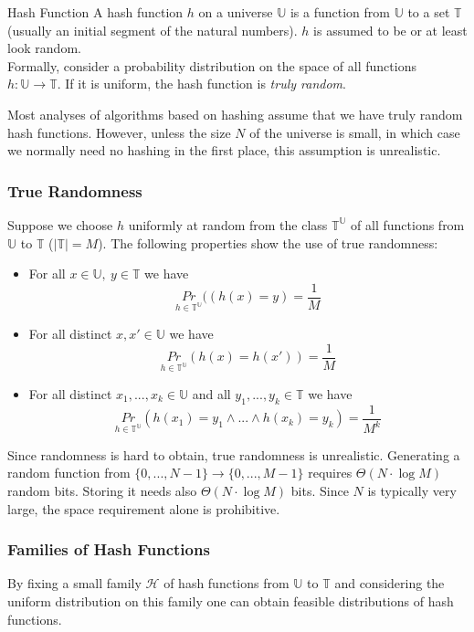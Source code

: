 \documentclass[english]{panikzettel}
\begin{document}
\begin{defi}{Hash Function}
A hash function $h$ on a universe $\mathbb{U}$ is a function from $\mathbb{U}$ to a set $\mathbb{T}$ (usually an initial segment of the natural numbers). $h$ is assumed to be or at least look random.\\
Formally, consider a probability distribution on the space of all functions $h:\mathbb{U}\to\mathbb{T}$. If it is uniform, the hash function is \emph{truly random}.
\end{defi}

Most analyses of algorithms based on hashing assume that we have truly random hash functions. However, unless the size $N$ of the universe is small, in which case we normally need no hashing in the first place, this assumption is unrealistic.

\subsubsection{True Randomness}
Suppose we choose $h$ uniformly at random from the class $\mathbb{T}^\mathbb{U}$ of all functions from $\mathbb{U}$ to $\mathbb{T}$ ($|\mathbb{T}|=M$). The following properties show the use of true randomness:
\begin{itemize}
\item For all $x\in\mathbb{U}, \ y\in \mathbb{T}$ we have
\[
\underset{h\in\mathbb{T}^\mathbb{U}}{Pr}((h(x)=y)=\frac{1}{M}
\]
\item For all distinct $x,x'\in\mathbb{U}$ we have
\[
\underset{h\in\mathbb{T}^\mathbb{U}}{Pr}(h(x) = h(x'))=\frac{1}{M}
\]
\item For all distinct $x_1,...,x_k\in\mathbb{U}$ and all $y_1,...,y_k\in\mathbb{T}$ we have
\[
\underset{h\in\mathbb{T}^\mathbb{U}}{Pr}(h(x_1)=y_1 \wedge ... \wedge h(x_k)=y_k)=\frac{1}{M^k}
\]
\end{itemize}
Since randomness is hard to obtain, true randomness is unrealistic.
Generating a random function from $\{0,...,N-1 \} \to \{0,...,M-1 \}$ requires $\Theta(N\cdot \log M)$ random bits.
Storing it needs also $\Theta(N\cdot \log M)$ bits.
Since $N$ is typically very large, the space requirement alone is prohibitive.

\subsubsection{Families of Hash Functions}
By fixing a small family $\mathcal{H}$ of hash functions from $\mathbb{U}$ to $\mathbb{T}$ and considering the uniform distribution on this family one can obtain feasible distributions of hash functions.
\end{document}
